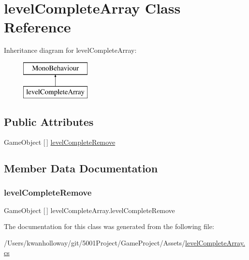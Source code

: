 \hypertarget{classlevel_complete_array}{}\section{level\+Complete\+Array Class Reference}
\label{classlevel_complete_array}
Inheritance diagram for level\+Complete\+Array\+:\begin{figure}[H]
\begin{center}
\leavevmode
\includegraphics[height=2.000000cm]{classlevel_complete_array}
\end{center}
\end{figure}
\subsection*{Public Attributes}
\begin{DoxyCompactItemize}
\item 
Game\+Object \mbox{[}$\,$\mbox{]} \hyperlink{classlevel_complete_array_a24b83f2696ca2c65b1412047a618f49b}{level\+Complete\+Remove}
\end{DoxyCompactItemize}


\subsection{Member Data Documentation}
\mbox{\label{classlevel_complete_array_a24b83f2696ca2c65b1412047a618f49b}} 
\subsubsection{\texorpdfstring{level\+Complete\+Remove}{levelCompleteRemove}}
{\footnotesize\ttfamily Game\+Object \mbox{[}$\,$\mbox{]} level\+Complete\+Array.\+level\+Complete\+Remove}



The documentation for this class was generated from the following file\+:\begin{DoxyCompactItemize}
\item 
/\+Users/kwanholloway/git/5001\+Project/\+Game\+Project/\+Assets/\hyperlink{level_complete_array_8cs}{level\+Complete\+Array.\+cs}\end{DoxyCompactItemize}
